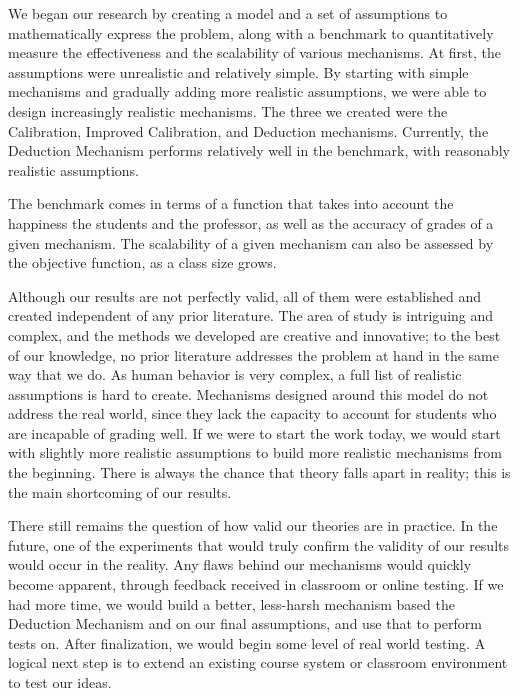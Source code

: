 \documentclass[12pt, Arial]{article}
\begin{document}
We began our research by creating a model and a set of assumptions to mathematically express the problem, along with a benchmark to quantitatively measure the effectiveness and the scalability of various mechanisms. At first, the assumptions were unrealistic and relatively simple. By starting with simple mechanisms and gradually adding more realistic assumptions, we were able to design increasingly realistic mechanisms. The three we created were the Calibration, Improved Calibration, and Deduction mechanisms. Currently, the Deduction Mechanism performs relatively well in the benchmark, with reasonably realistic assumptions.

The benchmark comes in terms of a function that takes into account the happiness the students and the professor, as well as the accuracy of grades of a given mechanism. The scalability of a given mechanism can also be assessed by the objective function, as a class size grows.

Although our results are not perfectly valid, all of them were established and created independent of any prior literature. The area of study is intriguing and complex, and the methods we developed are creative and innovative; to the best of our knowledge, no prior literature addresses the problem at hand in the same way that we do. As human behavior is very complex, a full list of realistic assumptions is hard to create. Mechanisms designed around this model do not address the real world, since they lack the capacity to account for students who are incapable of grading well. If we were to start the work today, we would start with slightly more realistic assumptions to build more realistic mechanisms from the beginning. There is always the chance that theory falls apart in reality; this is the main shortcoming of our results. 

There still remains the question of how valid our theories are in practice. In the future, one of the experiments that would truly confirm the validity of our results would occur in the reality. Any flaws behind our mechanisms would quickly become apparent, through feedback received in classroom or online testing. If we had more time, we would build a better, less-harsh mechanism based the Deduction Mechanism and on our final assumptions, and use that to perform tests on. After finalization, we would begin some level of real world testing. A logical next step is to extend an existing course system or classroom environment to test our ideas.

\newpage
{}

\end{document}
